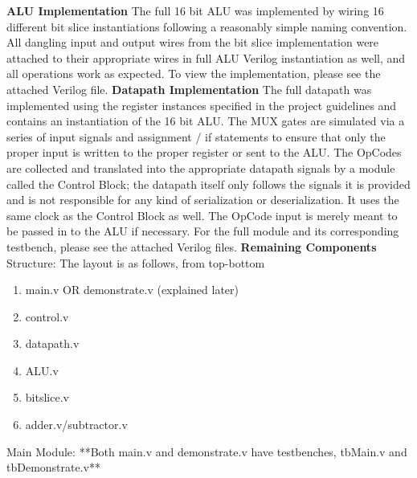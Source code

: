 \documentclass[12pt]{article}
\begin{document}
 \textbf{ALU Implementation}
 \newline \newline
The full 16 bit ALU was implemented by wiring 16 different bit slice instantiations following a reasonably simple 
naming convention. All dangling input and output wires from the bit slice implementation were attached to their 
appropriate wires in full ALU Verilog instantiation as well, and all operations work as expected. To view the 
implementation, please see the attached Verilog file. 
 \newline \newline
 \textbf{Datapath Implementation}
 \newline \newline
The full datapath was implemented using the register instances specified in the project guidelines and contains
an instantiation of the 16 bit ALU. The MUX gates are simulated via a series of input signals and assignment / if
statements to ensure that only the proper input is written to the proper register or sent to the ALU. The OpCodes
are collected and translated into the appropriate datapath signals by a module called the Control Block; the datapath 
itself only follows the signals it is provided and is not responsible for any kind of serialization or deserialization. It
uses the same clock as the Control Block as well. The OpCode input is merely meant to be passed in to the ALU
if necessary. For the full module and its corresponding testbench, please see the attached Verilog files. 
 \newline \newline
\textbf{Remaining Components}
\newline \newline
Structure:
\newline \newline
The layout is as follows, from top-bottom
\begin{enumerate}
	\item main.v OR demonstrate.v (explained later)
	\item control.v
	\item datapath.v
	\item ALU.v
	\item bitslice.v
	\item adder.v/subtractor.v
\end{enumerate}
Main Module:
\newline \newline
**Both main.v and demonstrate.v have testbenches, tbMain.v and tbDemonstrate.v** 
\end{document}
